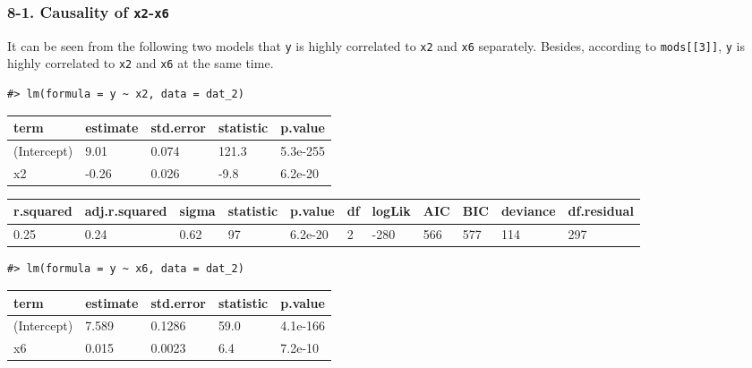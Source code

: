 \documentclass[main.tex]{subfiles}
\begin{document}
\hypertarget{causality-of-x2-x6}{%
\subsubsection{\texorpdfstring{8-1. Causality of
\texttt{x2}-\texttt{x6}}{8-1. Causality of x2-x6}}\label{causality-of-x2-x6}}

It can be seen from the following two models that \texttt{y} is highly
correlated to \texttt{x2} and \texttt{x6} separately. Besides, according
to \texttt{mods{[}{[}3{]}{]}}, \texttt{y} is highly correlated to
\texttt{x2} and \texttt{x6} at the same time.

\begin{verbatim}
#> lm(formula = y ~ x2, data = dat_2)
\end{verbatim}

\begin{table}[H]
\centering
\begin{tabular}{lllll}
\toprule
term & estimate & std.error & statistic & p.value\\
\midrule
(Intercept) & 9.01 & 0.074 & 121.3 & 5.3e-255\\
x2 & -0.26 & 0.026 & -9.8 & 6.2e-20\\
\bottomrule
\end{tabular}
\end{table}

\begin{table}[H]
\centering
\begin{tabular}{lllllllllll}
\toprule
r.squared & adj.r.squared & sigma & statistic & p.value & df & logLik & AIC & BIC & deviance & df.residual\\
\midrule
0.25 & 0.24 & 0.62 & 97 & 6.2e-20 & 2 & -280 & 566 & 577 & 114 & 297\\
\bottomrule
\end{tabular}
\end{table}

\begin{verbatim}
#> lm(formula = y ~ x6, data = dat_2)
\end{verbatim}

\begin{table}[H]
\centering
\begin{tabular}{lllll}
\toprule
term & estimate & std.error & statistic & p.value\\
\midrule
(Intercept) & 7.589 & 0.1286 & 59.0 & 4.1e-166\\
x6 & 0.015 & 0.0023 & 6.4 & 7.2e-10\\
\bottomrule
\end{tabular}
\end{table}
\end{document}
